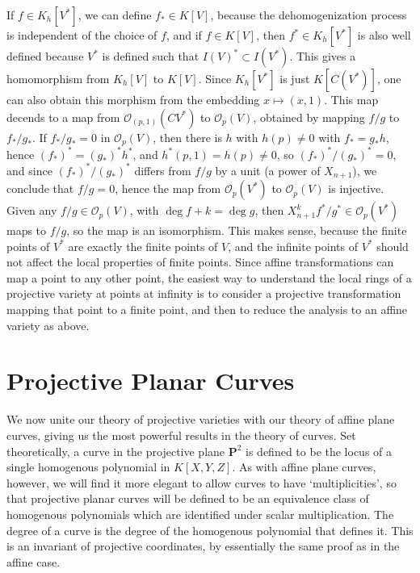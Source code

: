 If $f \in K_h[V^*]$, we can define $f_* \in K[V]$, because the dehomogenization process is independent of the choice of $f$, and if $f \in K[V]$, then $f^* \in K_h[V^*]$ is also well defined because $V^*$ is defined such that $I(V)^* \subset I(V^*)$. This gives a homomorphism from $K_h[V]$ to $K[V]$. Since $K_h[V^*]$ is just $K[C(V^*)]$, one can also obtain this morphism from the embedding $x \mapsto (x,1)$. This map decends to a map from $\mathcal{O}_{(p,1)}(CV^*)$ to $\mathcal{O}_p(V)$, obtained by mapping $f/g$ to $f_*/g_*$. If $f_*/g_* = 0$ in $\mathcal{O}_p(V)$, then there is $h$ with $h(p) \neq 0$ with $f_* = g_*h$, hence $(f_*)^* = (g_*)^* h^*$, and $h^*(p,1) = h(p) \neq 0$, so $(f_*)^*/(g_*)^* = 0$, and since $(f_*)^*/(g_*)^*$ differs from $f/g$ by a unit (a power of $X_{n+1}$), we conclude that $f/g = 0$, hence the map from $\mathcal{O}_p(V^*)$ to $\mathcal{O}_p(V)$ is injective. Given any $f/g \in \mathcal{O}_p(V)$, with $\deg f + k = \deg g$, then $X_{n+1}^kf^*/g^* \in \mathcal{O}_p(V^*)$ maps to $f/g$, so the map is an isomorphism. This makes sense, because the finite points of $V^*$ are exactly the finite points of $V$, and the infinite points of $V^*$ should not affect the local properties of finite points. Since affine transformations can map a point to any other point, the easiest way to understand the local rings of a projective variety at points at infinity is to consider a projective transformation mapping that point to a finite point, and then to reduce the analysis to an affine variety as above.

\chapter{Projective Planar Curves}

We now unite our theory of projective varieties with our theory of affine plane curves, giving us the most powerful results in the theory of curves. Set theoretically, a curve in the projective plane $\mathbf{P}^2$ is defined to be the locus of a single homogenous polynomial in $K[X,Y,Z]$. As with affine plane curves, however, we will find it more elegant to allow curves to have `multiplicities', so that projective planar curves will be defined to be an equivalence class of homogenous polynomials which are identified under scalar multiplication. The degree of a curve is the degree of the homogenous polynomial that defines it. This is an invariant of projective coordinates, by essentially the same proof as in the affine case.

